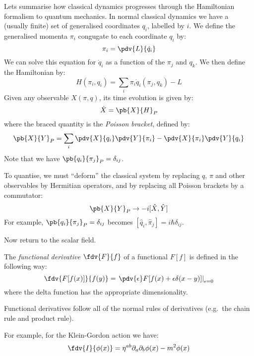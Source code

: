 \documentclass{jknotes} %
\begin{document}
Lets summarise how classical dynamics progresses through the Hamiltonian formalism to quantum mechanics. In normal classical dynamics we have a (usually finite) set of generalised coordinates \(q_i\), labelled by \(i\). We define the generalised momenta \(\pi_i\) congugate to each coordinate \(q_i\) by:
\begin{equation}
    \pi_i = \pdv{L}{\dot{q}_i}
\end{equation}
We can solve this equation for \(\dot{q}_i\) as a function of the \(\pi_j\) and \(q_k\). We then define the Hamiltonian by:
\begin{equation}
    H(\pi_i,q_i) = \sum_i \pi_i \dot{q}_i(\pi_j,q_k) - L
\end{equation}
Given any observable \(X(\pi,q)\), its time evolution is given by:
\begin{equation}
    \dot{X} = \pb{X}{H}_P
\end{equation}
where the braced quantity is the \emph{Poisson bracket}, defined by:
\begin{equation}
    \pb{X}{Y}_P = \sum_i \pdv{X}{q_i}\pdv{Y}{\pi_i}-\pdv{X}{\pi_i}\pdv{Y}{q_i}
\end{equation}
Note that we have \(\pb{q_i}{\pi_j}_P = \delta_{ij}\).

To quantise, we must ``deform'' the classical system by replacing \(q\), \(\pi\) and other observables by Hermitian operators, and by replacing all Poisson brackets by a commutator:
\begin{equation}
    \pb{X}{Y}_P \rightarrow -i[\hat{X},\hat{Y}]
\end{equation}
For example, \(\pb{q_i}{\pi_j}_P = \delta_{ij}\) becomes \([\hat{q}_i,\hat\pi_j] = i\hbar\delta_{ij}\).

Now return to the scalar field. 
\begin{defn}
    The \emph{functional derivative} \(\fdv{F}{f}\) of a functional \(F[f]\) is defined in the following way:
    \begin{equation}
        \fdv{F[f(x)]}{f(y)} = \left. \pdv{\epsilon}F[f(x)+\epsilon\delta(x-y)] \right|_{\epsilon=0}
    \end{equation}
    where the delta function has the appropriate dimensionality.
\end{defn}
Functional derivatives follow all of the normal rules of derivatives (e.g.\ the chain rule and product rule). 

For example, for the Klein-Gordon action we have:
\begin{equation}
    \fdv{I}{\phi(x)} = \eta^{ab}\partial_a\partial_b \phi(x) - m^2 \phi(x)
\end{equation}
\end{document}
